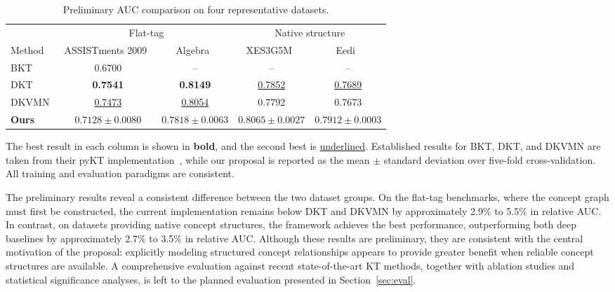 \documentclass[conference]{IEEEtran}
\begin{document}
\begin{table}[!htbp]
\centering
\caption{Preliminary AUC comparison on four representative datasets.}
\label{tab:prelim_results}
\begin{tabular}{lcccc}
\toprule
& \multicolumn{2}{c}{Flat-tag} & \multicolumn{2}{c}{Native structure} \\
\cmidrule(lr){2-3}\cmidrule(lr){4-5}
Method & ASSISTments 2009~\cite{feng2009assistments} & Algebra~\cite{stamper2010kddcup} & XES3G5M~\cite{liu2023xes3g5m} & Eedi~\cite{wang2021neurips} \\
\midrule
BKT~\cite{corbett1994kt}  & 0.6700 & -- & -- & -- \\
DKT~\cite{piech2015dkt} & \textbf{0.7541} & \textbf{0.8149} & \underline{0.7852} & \underline{0.7689} \\
DKVMN~\cite{zhang2017dkvmn} & \underline{0.7473} & \underline{0.8054} & 0.7792 & 0.7673 \\
\textbf{Ours} & $0.7128 \pm 0.0080$ & $0.7818 \pm 0.0063$ & $\mathbf{0.8065 \pm 0.0027}$ & $\mathbf{0.7912 \pm 0.0003}$ \\
\bottomrule
\end{tabular}
\begin{flushleft}
\footnotesize
The best result in each column is shown in \textbf{bold}, and the second best is \underline{underlined}. Established results for BKT, DKT, and DKVMN are taken from their pyKT implementation~\cite{zitao2022pykt}, while our proposal is reported as the mean $\pm$ standard deviation over five-fold cross-validation. All training and evaluation paradigms are consistent.
\end{flushleft}
\end{table}

The preliminary results reveal a consistent difference between the two dataset groups. On the flat-tag benchmarks, where the concept graph must first be constructed, the current implementation remains below DKT and DKVMN by approximately 2.9\% to 5.5\% in relative AUC. In contrast, on datasets providing native concept structures, the framework achieves the best performance, outperforming both deep baselines by approximately 2.7\% to 3.5\% in relative AUC. Although these results are preliminary, they are consistent with the central motivation of the proposal: explicitly modeling structured concept relationships appears to provide greater benefit when reliable concept structures are available. A comprehensive evaluation against recent state-of-the-art KT methods, together with ablation studies and statistical significance analyses, is left to the planned evaluation presented in Section~\ref{sec:eval}.
\end{document}
